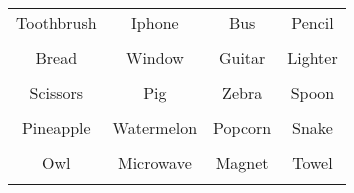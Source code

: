 \documentclass[12pt,a4paper]{article}
\begin{document}
\thispagestyle{empty}
\begin{table}[]
\centering
\Huge
\begin{tabular}{cccc}
 Toothbrush& Iphone& Bus& Pencil\\  & & & \\
 Bread& Window& Guitar& Lighter\\  & & & \\
 Scissors& Pig& Zebra& Spoon\\  & & & \\
 Pineapple& Watermelon& Popcorn& Snake\\  & & & \\
 Owl& Microwave& Magnet& Towel\\  & & & \\
\end{tabular}
\end{table}
\end{document}
